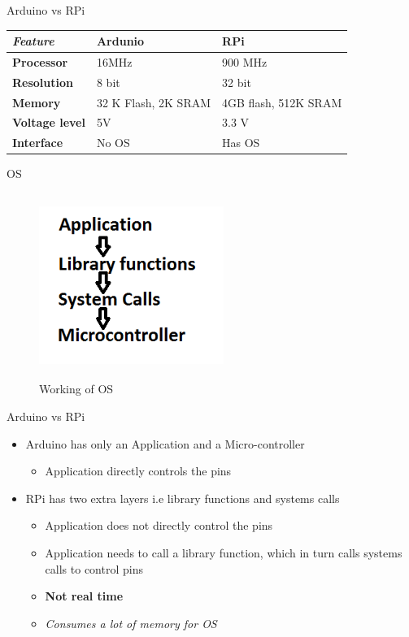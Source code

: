 \begin{frame}{Arduino vs RPi}
	\begin{table}
		\centering
		\begin{tabular}{|l|l|l|}
			\hline
			\textit{Feature} & \textbf{Ardunio} & \textbf{RPi} \\ \hline
			\textbf{Processor} & 16MHz & 900 MHz \\ \hline
			\textbf{Resolution} & 8 bit & 32 bit \\ \hline
			\textbf{Memory} & 32 K Flash, 2K SRAM & 4GB flash, 512K SRAM \\ \hline
			\textbf{Voltage level} & 5V & 3.3 V \\ \hline
			\textbf{Interface} & No OS & Has OS \\ \hline
		\end{tabular}
	\end{table}
\end{frame}

\begin{frame}{OS}
	\begin{figure}
		\centering
		\includegraphics[width=6cm,height=6cm,keepaspectratio]{os}
		\caption{Working of OS}
	\end{figure}
\end{frame}

\begin{frame}{Arduino vs RPi}
	\begin{itemize}
		\item Arduino has only an Application and a Micro-controller
		\begin{itemize}
			\item Application directly controls the pins
		\end{itemize}
		\item RPi has two extra layers i.e library functions and systems calls
		\begin{itemize}
			\item Application does not directly control the pins
			\item Application needs to call a library function, which in turn calls systems calls to control pins
			\item \textbf{Not real time}
			\item \textit{Consumes a lot of memory for OS}
		\end{itemize} 
	\end{itemize}
\end{frame}

